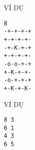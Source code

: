 VÍ DỤ
\begin{verbatim}
8
-+-+-+-+
+-+-+-+-
-+-K-+-+
+-+-+-+-
-o-o-+-+
+-K-+-+-
-o-+-+-+
+-K-+-K-
\end{verbatim}
VÍ DỤ
\begin{verbatim}
8 3
6 1
4 3
6 5
\end{verbatim}